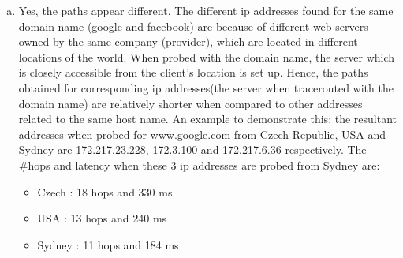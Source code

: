 \documentclass{article}
\begin{document}
\begin{enumerate}[a)]
\begin{itemize}
        \end{itemize}{}
        \item Yes, the paths appear different. The different ip addresses found for the same domain name (google and facebook) are because of different web servers owned by the same company (provider), which are located in different locations of the world. When probed with the domain name, the server which is closely accessible from the client's location is set up.
        Hence, the paths obtained for corresponding ip addresses(the server when tracerouted with the domain name) are relatively shorter when compared to other addresses related to the same host name.
        An example to demonstrate this: the resultant addresses when probed for www.google.com from Czech Republic, USA and Sydney are 172.217.23.228, 172.3.100 and 172.217.6.36 respectively. The #hops and latency when these 3 ip addresses are probed from Sydney are:
        \begin{itemize}
            \item Czech : 18 hops and 330 ms
            \item USA : 13 hops and 240 ms
            \item Sydney : 11 hops and 184 ms
        \end{itemize}{}
        

\end{enumerate}
\end{document}
